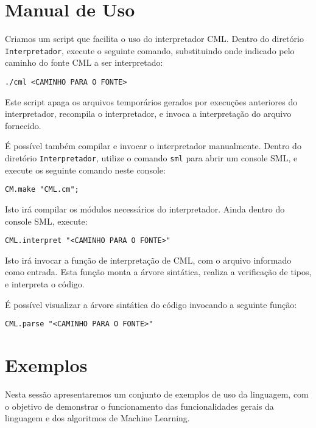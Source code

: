 \documentclass[12pt]{article}
\begin{document}
\section{Manual de Uso}

Criamos um script que facilita o uso do interpretador CML. Dentro do diretório \texttt{Interpretador}, execute o seguinte comando, substituindo onde indicado pelo caminho do fonte CML a ser interpretado:

\begin{verbatim}
./cml <CAMINHO PARA O FONTE>
\end{verbatim}

Este script apaga os arquivos temporários gerados por execuções anteriores do interpretador, recompila o interpretador, e invoca a interpretação do arquivo fornecido.

É possível também compilar e invocar o interpretador manualmente. Dentro do diretório \texttt{Interpretador}, utilize o comando \texttt{sml} para abrir um console SML, e execute os seguinte comando neste console:

\begin{verbatim}
CM.make "CML.cm";
\end{verbatim}

Isto irá compilar os módulos necessários do interpretador. Ainda dentro do console SML, execute:

\begin{verbatim}
CML.interpret "<CAMINHO PARA O FONTE>"
\end{verbatim}

Isto irá invocar a função de interpretação de CML, com o arquivo informado como entrada. Esta função monta a árvore sintática, realiza a verificação de tipos, e interpreta o código.

É possível visualizar a árvore sintática do código invocando a seguinte função:

\begin{verbatim}
CML.parse "<CAMINHO PARA O FONTE>"
\end{verbatim}

\section{Exemplos}

Nesta sessão apresentaremos um conjunto de exemplos de uso da linguagem, com o objetivo de demonstrar o funcionamento das funcionalidades gerais da linguagem e dos algoritmos de Machine Learning.
\end{document}
